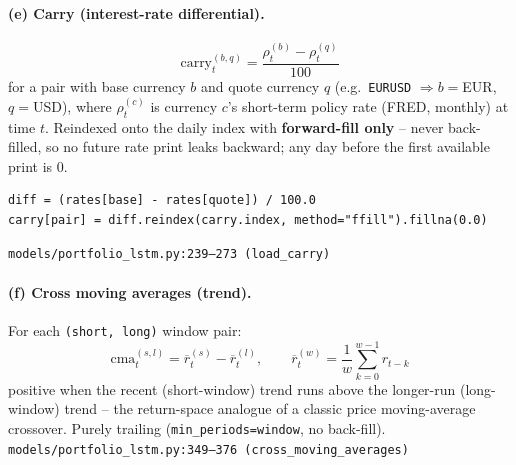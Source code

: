 \documentclass[11pt]{article}
\newcommand{\srcref}[1]{\hfill\textcolor{cmtcolor}{\footnotesize\texttt{#1}}}
\newcommand{\code}[1]{\texttt{\small #1}}
\begin{document}
\paragraph{(e) Carry (interest-rate differential).}
\begin{equation}
  \text{carry}_t^{(b,q)} = \frac{\rho_t^{(b)} - \rho_t^{(q)}}{100}
  \label{eq:carry}
\end{equation}
for a pair with base currency $b$ and quote currency $q$ (e.g.\ \texttt{EURUSD}
$\Rightarrow b{=}$EUR, $q{=}$USD), where $\rho_t^{(c)}$ is currency $c$'s short-term policy
rate (FRED, monthly) at time $t$. Reindexed onto the daily index with
\textbf{forward-fill only} -- never back-filled, so no future rate print leaks backward; any
day before the first available print is $0$.
\begin{lstlisting}[caption={Carry: forward-fill only, never back-filled.}, label=lst:carry]
diff = (rates[base] - rates[quote]) / 100.0
carry[pair] = diff.reindex(carry.index, method="ffill").fillna(0.0)
\end{lstlisting}
\srcref{models/portfolio\_lstm.py:239--273 (\texttt{load\_carry})}

\paragraph{(f) Cross moving averages (trend).} For each \code{(short, long)} window pair:
\begin{equation}
  \text{cma}_t^{(s,l)} = \overline{r}_{t}^{(s)} - \overline{r}_{t}^{(l)}, \qquad
  \overline{r}_t^{(w)} = \frac{1}{w}\sum_{k=0}^{w-1} r_{t-k}
  \label{eq:cma}
\end{equation}
positive when the recent (short-window) trend runs above the longer-run (long-window)
trend -- the return-space analogue of a classic price moving-average crossover. Purely
trailing (\code{min\_periods=window}, no back-fill).
\srcref{models/portfolio\_lstm.py:349--376 (\texttt{cross\_moving\_averages})}
\end{document}

